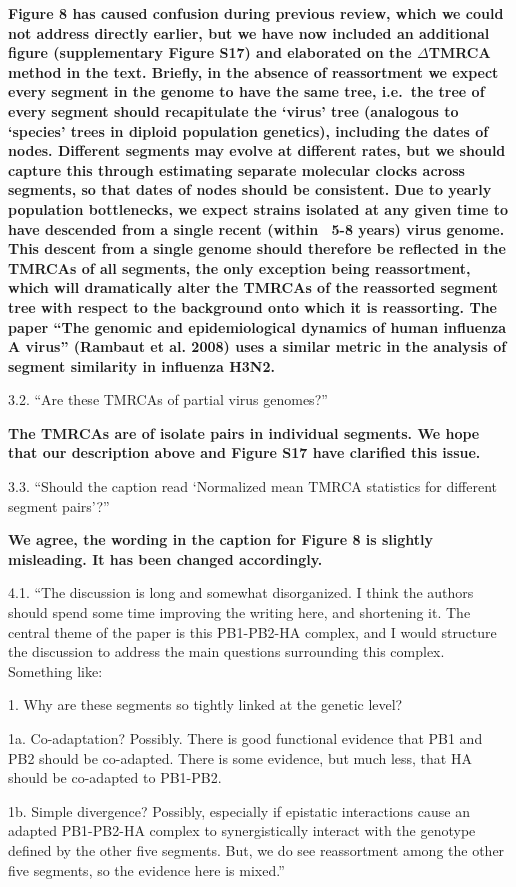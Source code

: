 \documentclass[11pt,oneside,letterpaper]{article}
\begin{document}
\textbf{Figure 8 has caused confusion during previous review, which we could not address directly earlier, but we have now included an additional figure (supplementary Figure S17) and elaborated on the $\Delta$TMRCA method in the text.
Briefly, in the absence of reassortment we expect every segment in the genome to have the same tree, i.e.\ the tree of every segment should recapitulate the `virus' tree (analogous to `species' trees in diploid population genetics), including the dates of nodes.
Different segments may evolve at different rates, but we should capture this through estimating separate molecular clocks across segments, so that dates of nodes should be consistent.
Due to yearly population bottlenecks, we expect strains isolated at any given time to have descended from a single recent (within ~5-8 years) virus genome.
This descent from a single genome should therefore be reflected in the TMRCAs of all segments, the only exception being reassortment, which will dramatically alter the TMRCAs of the reassorted segment tree with respect to the background onto which it is reassorting.
The paper ``The genomic and epidemiological dynamics of human influenza A virus'' (Rambaut et al. 2008) uses a similar metric in the analysis of segment similarity in influenza H3N2.}

3.2. ``Are these TMRCAs of partial virus genomes?''

\textbf{The TMRCAs are of isolate pairs in individual segments.
We hope that our description above and Figure S17 have clarified this issue.}

3.3. ``Should the caption read `Normalized mean TMRCA statistics for different segment pairs'?''

\textbf{We agree, the wording in the caption for Figure 8 is slightly misleading. It has been changed accordingly.}

4.1. ``The discussion is long and somewhat disorganized.
I think the authors should spend some time improving the writing here, and shortening it.
The central theme of the paper is this PB1-PB2-HA complex, and I would structure the discussion to address the main questions surrounding this complex.  
Something like:

1.  Why are these segments so tightly linked at the genetic level?

1a.  Co-adaptation?
Possibly.
There is good functional evidence that PB1 and PB2 should be co-adapted.
There is some evidence, but much less, that HA should be co-adapted to PB1-PB2.

1b.  Simple divergence?
Possibly, especially if epistatic interactions cause an adapted PB1-PB2-HA complex to synergistically interact with the genotype defined by the other five segments.
But, we do see reassortment among the other five segments, so the evidence here is mixed.''
\end{document}
